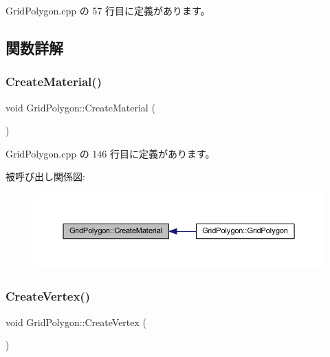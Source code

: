  Grid\+Polygon.\+cpp の 57 行目に定義があります。



\subsection{関数詳解}
\mbox{\label{class_grid_polygon_a6e9fc436896409cc4bfbf3a44d338d9b}} 
\subsubsection{\texorpdfstring{Create\+Material()}{CreateMaterial()}}
{\footnotesize\ttfamily void Grid\+Polygon\+::\+Create\+Material (\begin{DoxyParamCaption}{ }\end{DoxyParamCaption})\hspace{0.3cm}{\ttfamily [private]}}



 Grid\+Polygon.\+cpp の 146 行目に定義があります。

被呼び出し関係図\+:\nopagebreak
\begin{figure}[H]
\begin{center}
\leavevmode
\includegraphics[width=350pt]{class_grid_polygon_a6e9fc436896409cc4bfbf3a44d338d9b_icgraph}
\end{center}
\end{figure}
\mbox{\label{class_grid_polygon_a07b1e9c012d36086569860a30deb85d5}} 
\subsubsection{\texorpdfstring{Create\+Vertex()}{CreateVertex()}}
{\footnotesize\ttfamily void Grid\+Polygon\+::\+Create\+Vertex (\begin{DoxyParamCaption}{ }\end{DoxyParamCaption})\hspace{0.3cm}{\ttfamily [private]}}



